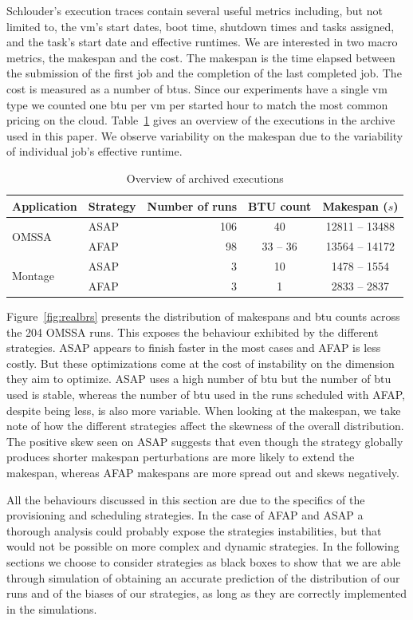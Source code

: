 \documentclass[10pt,conference,compsocconf]{IEEEtran}
\begin{document}
Schlouder's execution traces contain several useful metrics including, but not
limited to, the \ac{vm}'s start dates, boot time, shutdown times and tasks
assigned, and the task's start date and effective runtimes. We are interested in
two macro metrics, the makespan and the cost.  The makespan is the time elapsed
between the submission of the first job and the completion of the last completed
job. The cost is measured as a number of \acp{btu}. Since our experiments have a
single \ac{vm} type we counted one \ac{btu} per \ac{vm} per started hour to
match the most common pricing on the cloud. Table~\ref{tab:nbruns} gives an
overview of the executions in the archive used in this paper. We observe
variability on the makespan due to the variability of individual job's effective
runtime.
\begin{table}
	\centering
	\caption{Overview of archived executions}\label{tab:nbruns}
	\begin{tabular}{llrcc}
		\toprule
		Application&Strategy&Number of runs&BTU count&Makespan ($s$)\\
		\midrule
		\multirow{2}{*}{OMSSA}&ASAP&106&40&12811 -- 13488\\
				      &AFAP&98&33 -- 36&13564 -- 14172\\
		\midrule
		\multirow{2}{*}{Montage}&ASAP&3&10&1478 -- 1554\\
					&AFAP&3&1&2833 -- 2837\\
		\bottomrule
	\end{tabular}
\end{table}


Figure~\ref{fig:realbrs} presents the distribution of makespans and \ac{btu}
counts across the 204 OMSSA runs. This exposes the behaviour exhibited by the
different strategies. ASAP appears to finish faster in the most cases and AFAP
is less costly. But these optimizations come at the cost of instability on the
dimension they aim to optimize. ASAP uses a high number of \ac{btu} but the
number of \ac{btu} used is stable, whereas the number of \ac{btu} used in the
runs scheduled with AFAP, despite being less, is also more variable. When
looking at the makespan, we take note of how the different strategies affect the
skewness of the overall distribution. The positive skew seen on ASAP suggests
that even though the strategy globally produces shorter makespan perturbations
are more likely to extend the makespan, whereas AFAP makespans are more spread
out and skews negatively.

All the behaviours discussed in this section are due to the specifics of the
provisioning and scheduling strategies. In the case of AFAP and ASAP a thorough
analysis could probably expose the strategies instabilities, but that would not
be possible on more complex and dynamic strategies. In the following sections we
choose to consider strategies as black boxes to show that we are able through
simulation of obtaining an accurate prediction of the distribution of our runs
and of the biases of our strategies, as long as they are correctly implemented
in the simulations.
\end{document}
